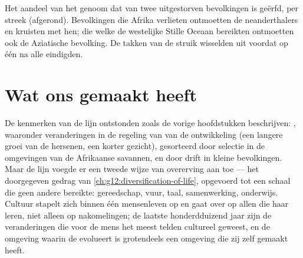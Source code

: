 \begin{omfigure}

{\small Het aandeel van het genoom dat van twee uitgestorven bevolkingen
is geërfd, per streek (afgerond). Bevolkingen die Afrika verlieten
ontmoetten de neanderthalers en kruisten met hen; die welke de westelijke
Stille Oceaan bereikten ontmoetten ook de Aziatische bevolking. De takken
van de struik wisselden  uit voordat op één na alle eindigden.}
\end{omfigure}

\section{Wat ons gemaakt heeft}

\begin{proposition}\label{prop:g12:human-evolution:culture}
De kenmerken van de lijn ontstonden zoals de vorige hoofdstukken
beschrijven: , waaronder veranderingen in de regeling van 
van de ontwikkeling (een langere groei van de hersenen, een korter
gezicht), gesorteerd door selectie in de omgevingen van de Afrikaanse
savannen, en door drift in kleine bevolkingen. Maar de lijn voegde er een
tweede wijze van overerving aan toe --- het doorgegeven gedrag van
\cref{ch:g12:diversification-of-life}, opgevoerd tot een schaal die geen
andere  bereikte: gereedschap, vuur, taal, samenwerking, onderwijs.
Cultuur stapelt zich binnen één mensenleven op en gaat over op allen die
haar leren, niet alleen op nakomelingen; de laatste honderdduizend jaar
zijn de veranderingen die voor de mens het meest telden cultureel geweest,
en de omgeving waarin de  evolueert is grotendeels een omgeving die
zij zelf gemaakt heeft.
\end{proposition}
\admitted

